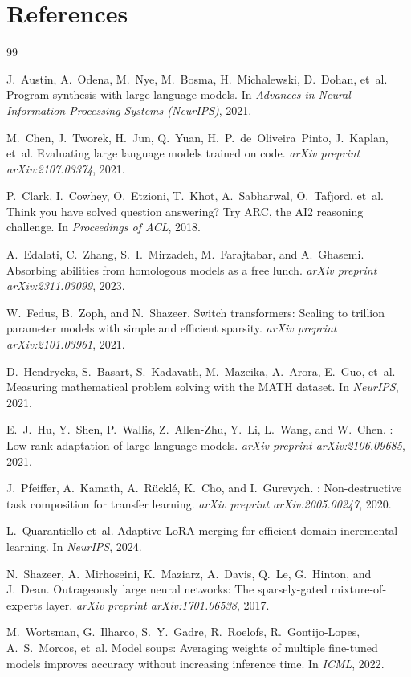\documentclass{article}
\begin{document}
\section*{References}
\small
\begin{thebibliography}{99}

J.~Austin, A.~Odena, M.~Nye, M.~Bosma, H.~Michalewski, D.~Dohan, et~al.
\newblock Program synthesis with large language models.
\newblock In \emph{Advances in Neural Information Processing Systems (NeurIPS)}, 2021.

M.~Chen, J.~Tworek, H.~Jun, Q.~Yuan, H.~P.\ de~Oliveira~Pinto, J.~Kaplan, et~al.
\newblock Evaluating large language models trained on code.
\newblock \emph{arXiv preprint arXiv:2107.03374}, 2021.

P.~Clark, I.~Cowhey, O.~Etzioni, T.~Khot, A.~Sabharwal, O.~Tafjord, et~al.
\newblock Think you have solved question answering? Try {ARC}, the {AI2} reasoning challenge.
\newblock In \emph{Proceedings of ACL}, 2018.

A.~Edalati, C.~Zhang, S.~I.\ Mirzadeh, M.~Farajtabar, and A.~Ghasemi.
\newblock Absorbing abilities from homologous models as a free lunch.
\newblock \emph{arXiv preprint arXiv:2311.03099}, 2023.

W.~Fedus, B.~Zoph, and N.~Shazeer.
\newblock Switch transformers: Scaling to trillion parameter models with simple and efficient sparsity.
\newblock \emph{arXiv preprint arXiv:2101.03961}, 2021.

D.~Hendrycks, S.~Basart, S.~Kadavath, M.~Mazeika, A.~Arora, E.~Guo, et~al.
\newblock Measuring mathematical problem solving with the {MATH} dataset.
\newblock In \emph{NeurIPS}, 2021.

E.~J.\ Hu, Y.~Shen, P.~Wallis, Z.~Allen-Zhu, Y.~Li, L.~Wang, and W.~Chen.
: Low-rank adaptation of large language models.
\newblock \emph{arXiv preprint arXiv:2106.09685}, 2021.

J.~Pfeiffer, A.~Kamath, A.~R\"uckl\'e, K.~Cho, and I.~Gurevych.
: Non-destructive task composition for transfer learning.
\newblock \emph{arXiv preprint arXiv:2005.00247}, 2020.

L.~Quarantiello et~al.
\newblock Adaptive {LoRA} merging for efficient domain incremental learning.
\newblock In \emph{NeurIPS}, 2024.

N.~Shazeer, A.~Mirhoseini, K.~Maziarz, A.~Davis, Q.~Le, G.~Hinton, and J.~Dean.
\newblock Outrageously large neural networks: The sparsely-gated mixture-of-experts layer.
\newblock \emph{arXiv preprint arXiv:1701.06538}, 2017.

M.~Wortsman, G.~Ilharco, S.~Y.\ Gadre, R.~Roelofs, R.~Gontijo-Lopes, A.~S.\ Morcos, et~al.
\newblock Model soups: Averaging weights of multiple fine-tuned models improves accuracy without increasing inference time.
\newblock In \emph{ICML}, 2022.

\end{thebibliography}
\end{document}
